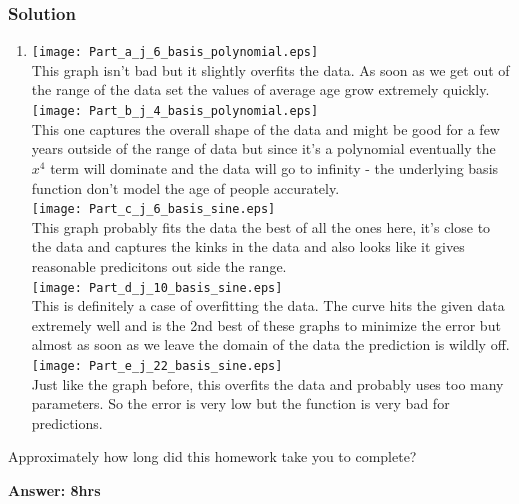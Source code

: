 \documentclass[submit]{harvardml}
\begin{document}
	\subsubsection*{Solution}
	\begin{enumerate}
		\item 
		\texttt{[image: Part\_a\_j\_6\_basis\_polynomial.eps]} \\
		This graph isn't bad but it slightly overfits the data.  As soon as we get out of the range of the data set the values of average age grow extremely quickly.  \\ 
		\texttt{[image: Part\_b\_j\_4\_basis\_polynomial.eps]} \\
		This one captures the overall shape of the data and might be good for a few years outside of the range of data but since it's a polynomial eventually the $x^4$ term will dominate and the data will go to infinity - the underlying basis function don't model the age of people accurately. \\  
		\texttt{[image: Part\_c\_j\_6\_basis\_sine.eps]} \\
		This graph probably fits the data the best of all the ones here, it's close to the data and captures the kinks in the data and also looks like it gives reasonable predicitons out side the range. \\ 
		\texttt{[image: Part\_d\_j\_10\_basis\_sine.eps]} \\
		This is definitely a case of overfitting the data.  The curve hits the given data extremely well and is the 2nd best of these graphs to minimize the error but almost as soon as we leave the domain of the data the prediction is wildly off.  \\
		\texttt{[image: Part\_e\_j\_22\_basis\_sine.eps]} \\
		Just like the graph before, this overfits the data and probably uses too many parameters.  So the error is very low but the function is very bad for predictions. \\   
		
	\end{enumerate}
	
	
	
	
	
	
	
	
	
	
	\newpage
	\begin{problem}[Calibration, 1pt]
		Approximately how long did this homework take you to complete?
	\end{problem}
	\textbf{Answer: 8hrs}
	
\end{document}
